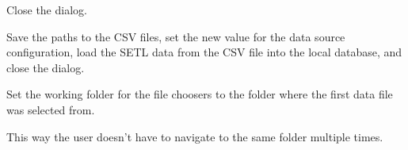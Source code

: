 \documentclass[letterpaper,10pt,english]{sphinxmanual}
\begin{document}
\begin{fulllineitems}
\begin{fulllineitems}
\end{fulllineitems}


\begin{fulllineitems}
\label{setlyze/gui:setlyze.gui.ChangeDataSource.on_cancel}
Close the dialog.

\end{fulllineitems}


\begin{fulllineitems}
\label{setlyze/gui:setlyze.gui.ChangeDataSource.on_csv_ok}
Save the paths to the CSV files, set the new value for the
data source configuration, load the SETL data from the CSV file
into the local database, and close the dialog.

\end{fulllineitems}


\begin{fulllineitems}
\label{setlyze/gui:setlyze.gui.ChangeDataSource.update_working_folder}
Set the working folder for the file choosers to the folder
where the first data file was selected from.

This way the user doesn't have to navigate to the same folder
multiple times.

\end{fulllineitems}


\end{fulllineitems}

\end{document}
